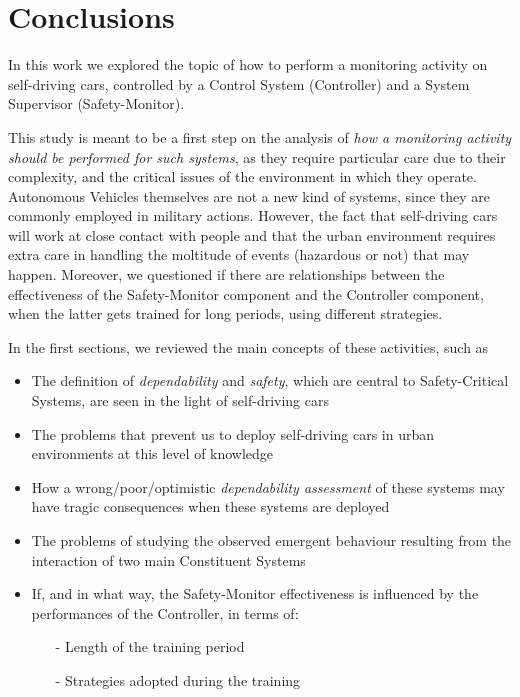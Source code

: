 \chapter{Conclusions}

In this work we explored the topic of how to perform a monitoring activity on self-driving cars, controlled by a Control System (Controller) and a System Supervisor (Safety-Monitor).

This study is meant to be a first step on the analysis of \textsl{how a monitoring activity should be performed for such systems}, as they require particular care due to their complexity, and the critical issues of the environment in which they operate. Autonomous Vehicles themselves are not a new kind of systems, since they are commonly employed in military actions. However, the fact that self-driving cars will work at close contact with people and that the urban environment requires extra care in handling the moltitude of events (hazardous or not) that may happen.
Moreover, we questioned if there are relationships between the effectiveness of the Safety-Monitor component and the Controller component, when the latter gets trained for long periods, using different strategies.

In the first sections, we reviewed the main concepts of these activities, such as

\begin{itemize}
	\item The definition of \textsl{dependability} and \textsl{safety}, which are central to Safety-Critical Systems, are seen in the light of self-driving cars
	\item The problems that prevent us to deploy self-driving cars in urban environments at this level of knowledge
	\item How a wrong/poor/optimistic \textsl{dependability assessment} of these systems may have tragic consequences when these systems are deployed
	\item The problems of studying the observed emergent behaviour resulting from the interaction of two main Constituent Systems
	\item If, and in what way, the Safety-Monitor effectiveness is influenced by the performances of the Controller, in terms of:
	\begin{itemize}
		\item[-] Length of the training period
		\item[-] Strategies adopted during the training
	\end{itemize}
\end{itemize}

